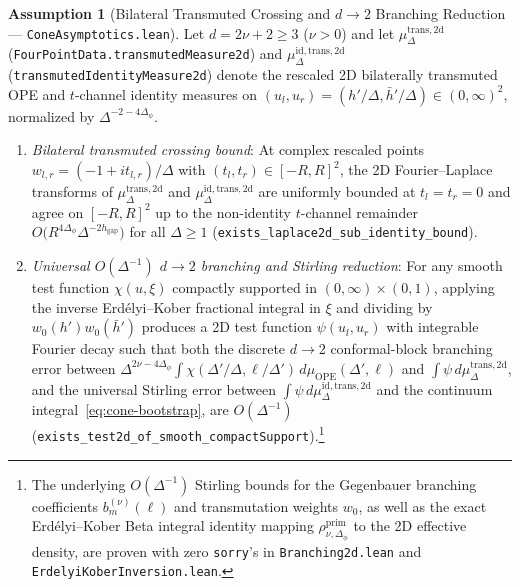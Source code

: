 \documentclass[10pt,a4paper]{article}
\theoremstyle{definition}
\newtheorem{assumption}{Assumption}
\begin{document}
\begin{assumption}[Bilateral Transmuted Crossing and $d \to 2$ Branching Reduction --- \texttt{ConeAsymptotics.lean}]
\label{assump:cone}
Let $d = 2\nu + 2 \ge 3$ ($\nu > 0$) and let $\mu^{\mathrm{trans}, 2\mathrm{d}}_\Delta$ (\texttt{FourPointData.transmutedMeasure2d}) and $\mu^{\mathrm{id, trans}, 2\mathrm{d}}_\Delta$ (\texttt{transmutedIdentityMeasure2d}) denote the rescaled 2D bilaterally transmuted OPE and $t$-channel identity measures on $(u_l, u_r) = (h'/\Delta, \bar{h}'/\Delta) \in (0, \infty)^2$, normalized by $\Delta^{-2 - 4\Delta_\phi}$.
\begin{enumerate}
  \item \emph{Bilateral transmuted crossing bound}: At complex rescaled points $w_{l,r} = (-1 + i t_{l,r})/\Delta$ with $(t_l, t_r) \in [-R, R]^2$, the 2D Fourier--Laplace transforms of $\mu^{\mathrm{trans}, 2\mathrm{d}}_\Delta$ and $\mu^{\mathrm{id, trans}, 2\mathrm{d}}_\Delta$ are uniformly bounded at $t_l = t_r = 0$ and agree on $[-R, R]^2$ up to the non-identity $t$-channel remainder $O\bigl(R^{4\Delta_\phi} \Delta^{-2 h_{\mathrm{gap}}}\bigr)$ for all $\Delta \ge 1$ (\texttt{exists\_laplace2d\_sub\_identity\_bound}).
  \item \emph{Universal $O(\Delta^{-1})$ $d \to 2$ branching and Stirling reduction}: For any smooth test function $\chi(u, \xi)$ compactly supported in $(0, \infty) \times (0, 1)$, applying the inverse Erd\'elyi--Kober fractional integral in $\xi$ and dividing by $w_0(h') w_0(\bar{h}')$ produces a 2D test function $\psi(u_l, u_r)$ with integrable Fourier decay such that both the discrete $d \to 2$ conformal-block branching error between $\Delta^{2\nu - 4\Delta_\phi} \int \chi(\Delta'/\Delta, \ell/\Delta') \, d\mu_{\mathrm{OPE}}(\Delta', \ell)$ and $\int \psi \, d\mu^{\mathrm{trans}, 2\mathrm{d}}_\Delta$, and the universal Stirling error between $\int \psi \, d\mu^{\mathrm{id, trans}, 2\mathrm{d}}_\Delta$ and the continuum integral~\eqref{eq:cone-bootstrap}, are $O(\Delta^{-1})$ (\texttt{exists\_test2d\_of\_smooth\_compactSupport}).\footnote{The underlying $O(\Delta^{-1})$ Stirling bounds for the Gegenbauer branching coefficients $b_m^{(\nu)}(\ell)$ and transmutation weights $w_0$, as well as the exact Erd\'elyi--Kober Beta integral identity mapping $\rho^{\mathrm{prim}}_{\nu, \Delta_\phi}$ to the 2D effective density, are proven with zero \texttt{sorry}'s in \texttt{Branching2d.lean} and \texttt{ErdelyiKoberInversion.lean}.}
\end{enumerate}
\end{assumption}
\end{document}
